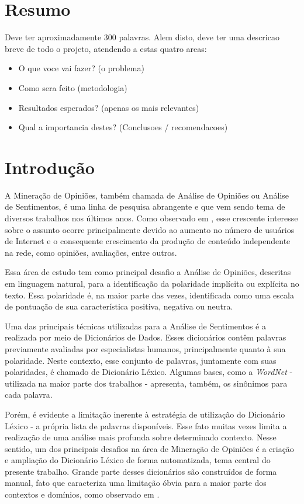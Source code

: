 \documentclass[a4paper,11pt]{article}
\begin{document}
\section{Resumo}
Deve ter aproximadamente 300 palavras. Alem disto, deve ter uma descricao breve de todo o projeto, atendendo a estas quatro areas:

\begin{itemize}
\item{O que voce vai fazer? (o problema)}
\item{Como sera feito (metodologia)}
\item{Resultados esperados? (apenas os mais relevantes)}
\item{Qual a importancia destes? (Conclusoes / recomendacoes)}
\end{itemize}

\section{Introdução}

A Mineração de Opiniões, também chamada de Análise de Opiniões ou Análise de Sentimentos, é uma linha de pesquisa abrangente e que vem sendo tema de diversos trabalhos nos últimos anos. Como observado em \cite{liu2010multifaceted}, esse crescente interesse sobre o assunto ocorre principalmente devido ao aumento no número de usuários de Internet e o consequente crescimento da produção de conteúdo independente na rede, como opiniões, avaliações, entre outros. 

Essa área de estudo tem como principal desafio a Análise de Opiniões, descritas em linguagem natural, para a identificação da polaridade implícita ou explícita no texto. Essa polaridade é, na maior parte das vezes, identificada como uma escala de pontuação de sua característica positiva, negativa ou neutra.

Uma das principais técnicas utilizadas para a Análise de Sentimentos é a realizada por meio de Dicionários de Dados. Esses dicionários contêm palavras previamente avaliadas por especialistas humanos, principalmente quanto à sua polaridade. Neste contexto, esse conjunto de palavras, juntamente com suas polaridades, é chamado de Dicionário Léxico. Algumas bases, como a \emph{WordNet} - utilizada na maior parte dos trabalhos - apresenta, também, os sinônimos para cada palavra.

Porém, é evidente a limitação inerente à estratégia de utilização do Dicionário Léxico - a própria lista de palavras disponíveis. Esse fato muitas vezes limita a realização de uma análise mais profunda sobre determinado contexto. Nesse sentido, um dos principais desafios na área de Mineração de Opiniões é a criação e ampliação do Dicionário Léxico de forma automatizada, tema central do presente trabalho. Grande parte desses dicionários são construídos de forma manual, fato que caracteriza uma limitação óbvia para a maior parte dos contextos e domínios, como observado em \cite{duwairi2015detecting}. 
\end{document}
